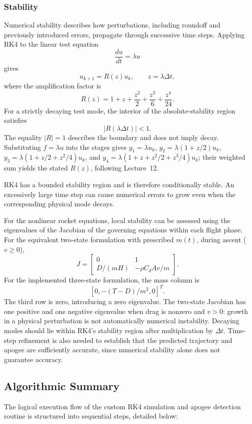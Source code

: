 \documentclass{article}
\begin{document}
\subsubsection{Stability}%

Numerical stability describes how perturbations, including roundoff
and previously introduced errors, propagate through successive time
steps. Applying RK4 to the linear test equation
\[
\frac{du}{dt} = \lambda u
\]
gives
\[
u_{k+1} = R(z)u_k,
\qquad z = \lambda\Delta t,
\]
where the amplification factor is
\[
R(z) = 1 + z + \frac{z^2}{2}
+ \frac{z^3}{6} + \frac{z^4}{24}.
\]
For a strictly decaying test mode, the interior of the absolute-stability region satisfies
\[
|R(\lambda\Delta t)| < 1.
\]
The equality $|R|=1$ describes the boundary and does not imply decay. Substituting $f=\lambda u$ into the stages gives $y_1=\lambda u_k$, $y_2=\lambda(1+z/2)u_k$, $y_3=\lambda(1+z/2+z^2/4)u_k$, and $y_4=\lambda(1+z+z^2/2+z^3/4)u_k$; their weighted sum yields the stated $R(z)$, following Lecture~12.

RK4 has a bounded stability region and is therefore conditionally
stable. An excessively large time step can cause numerical errors
to grow even when the corresponding physical mode decays.

For the nonlinear rocket equations, local stability can be assessed
using the eigenvalues of the Jacobian of the governing equations
within each flight phase. For the equivalent two-state formulation with prescribed $m(t)$, during ascent ($v\geq0$),
\[
J=\begin{bmatrix}0&1\\D/(mH)&-\rho C_dAv/m\end{bmatrix}.
\]
For the implemented three-state formulation, the mass column is
\[
[0,-(T-D)/m^2,0]^T.
\]
The third row is zero, introducing a zero eigenvalue. The two-state Jacobian has one positive and one negative eigenvalue when drag is nonzero and $v>0$: growth in a physical perturbation is not automatically numerical instability. Decaying modes should lie within RK4's
stability region after multiplication by $\Delta t$. Time-step
refinement is also needed to establish that the predicted trajectory
and apogee are sufficiently accurate, since numerical stability
alone does not guarantee accuracy.



\subsection{Algorithmic Summary}%
The logical execution flow of the custom RK4 simulation and apogee detection routine is structured into sequential steps, detailed below:
\end{document}
